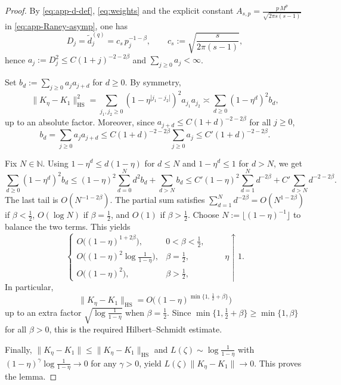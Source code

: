 \documentclass[11pt]{amsart}
\numberwithin{equation}{section}
\theoremstyle{plain}
\theoremstyle{definition}
\theoremstyle{remark}
\newcommand{\NN}{\mathbb{N}}
\begin{document}
\begin{proof}
	By \eqref{eq:app-d-def}, \eqref{eq:weights} and the explicit constant
	$A_{s,p}=\frac{p\,M^p}{\sqrt{2\pi s(s-1)}}$ in \eqref{eq:app-Raney-asymp}, one has
	\[
		D_j=\widetilde d^{(q)}_j
		=
		c_s\,p_j^{-1-\beta},
		\qquad
		c_s:=\sqrt{\frac{s}{2\pi(s-1)}},
	\]
	hence $a_j:=D_j^2\le C(1+j)^{-2-2\beta}$ and $\sum_{j\ge0}a_j<\infty$.

	Set $b_d:=\sum_{j\ge0}a_j a_{j+d}$ for $d\ge0$. By symmetry,
	\[
		\|K_\eta-K_1\|_{\mathrm{HS}}^2
		=
		\sum_{j_1,j_2\ge0}(1-\eta^{|j_1-j_2|})^2a_{j_1}a_{j_2}
		\asymp
		\sum_{d\ge0}(1-\eta^d)^2 b_d,
	\]
	up to an absolute factor. Moreover, since $a_{j+d}\le C(1+d)^{-2-2\beta}$ for all $j\ge0$,
	\[
		b_d=\sum_{j\ge0}a_j a_{j+d}
		\le
		C(1+d)^{-2-2\beta}\sum_{j\ge0}a_j
		\le
		C'(1+d)^{-2-2\beta}.
	\]

	Fix $N\in\NN$. Using $1-\eta^d\le d(1-\eta)$ for $d\le N$ and $1-\eta^d\le1$ for $d>N$, we get
	\[
		\sum_{d\ge0}(1-\eta^d)^2 b_d
		\le
		(1-\eta)^2\sum_{d=0}^{N} d^2 b_d
		+\sum_{d>N} b_d
		\le
		C'(1-\eta)^2\sum_{d=1}^{N} d^{-2\beta}
		+ C'\sum_{d>N} d^{-2-2\beta}.
	\]
	The last tail is $O(N^{-1-2\beta})$. The partial sum satisfies
	$\sum_{d=1}^{N} d^{-2\beta}=O(N^{1-2\beta})$ if $\beta<\frac12$, $O(\log N)$ if $\beta=\frac12$,
	and $O(1)$ if $\beta>\frac12$. Choose $N:=\lfloor(1-\eta)^{-1}\rfloor$ to balance the two terms. This yields
	\[
		\begin{cases}
			O\!\bigl((1-\eta)^{1+2\beta}\bigr),            & 0<\beta<\frac12, \\[2pt]
			O\!\bigl((1-\eta)^2\log\frac{1}{1-\eta}\bigr), & \beta=\frac12,   \\[2pt]
			O\!\bigl((1-\eta)^2\bigr),                     & \beta>\frac12,
		\end{cases}
		\qquad \eta\uparrow1.
	\]
	In particular,
	\[
		\|K_\eta-K_1\|_{\mathrm{HS}}
		=O\!\bigl((1-\eta)^{\min\{1,\,\frac12+\beta\}}\bigr)
	\]
	up to an extra factor \(\sqrt{\log\frac{1}{1-\eta}}\) when
	\(\beta=\frac12\). Since \(\min\{1,\frac12+\beta\}\ge \min\{1,\beta\}\)
	for all \(\beta>0\), this is the required Hilbert--Schmidt estimate.

	Finally, $\|K_\eta-K_1\|\le\|K_\eta-K_1\|_{\mathrm{HS}}$ and
	$L(\zeta)\sim\log\frac{1}{1-\eta}$ with
	$(1-\eta)^\gamma\log\frac{1}{1-\eta}\to0$ for any $\gamma>0$, yield
	$L(\zeta)\|K_\eta-K_1\|\to0$. This proves the lemma.
\end{proof}

\end{document}
